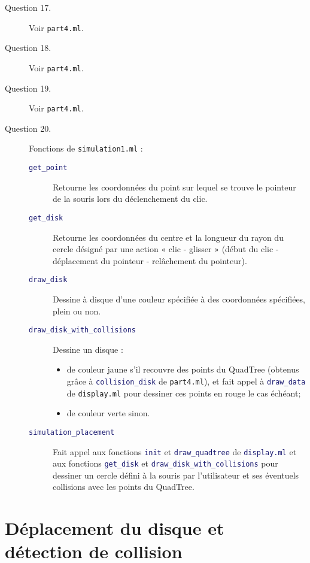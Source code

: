 \documentclass[11pt]{scrartcl}
\newcommand{\functionname}[1]{\texttt{\textcolor{MidnightBlue}{#1}}}
\newcommand{\filename}[1]{\texttt{\textcolor{RawSienna}{#1}}}
\begin{document}
\begin{description}
\item[Question 17.] Voir \filename{part4.ml}.

\item[Question 18.] Voir \filename{part4.ml}.

\item[Question 19.] Voir \filename{part4.ml}.

\item[Question 20.] Fonctions de \filename{simulation1.ml} :
\begin{description}
\item[\functionname{get_point}] Retourne les coordonnées du point sur lequel se trouve le pointeur de la souris lors du déclenchement du clic.
\item[\functionname{get_disk}] Retourne les coordonnées du centre et la longueur du rayon du cercle désigné par une action « clic - glisser » (début du clic - déplacement du pointeur - relâchement du pointeur).
\item[\functionname{draw_disk}] Dessine à disque d'une couleur spécifiée à des coordonnées spécifiées, plein ou non.
\item[\functionname{draw_disk_with_collisions}] Dessine un disque :
\begin{itemize}
\item de couleur jaune s'il recouvre des points du QuadTree (obtenus grâce à \functionname{collision_disk} de \filename{part4.ml}), et fait appel à \functionname{draw_data} de \filename{display.ml} pour dessiner ces points en rouge le cas échéant;
\item de couleur verte sinon.
\end{itemize}
\item[\functionname{simulation_placement}] Fait appel aux fonctions \functionname{init} et \functionname{draw_quadtree} de \functionname{display.ml} et aux fonctions \functionname{get_disk} et \functionname{draw_disk_with_collisions} pour dessiner un cercle défini à la souris par l'utilisateur et ses éventuels collisions avec les points du QuadTree.
\end{description}
\end{description}

\section{Déplacement du disque et détection de collision}
\end{document}
